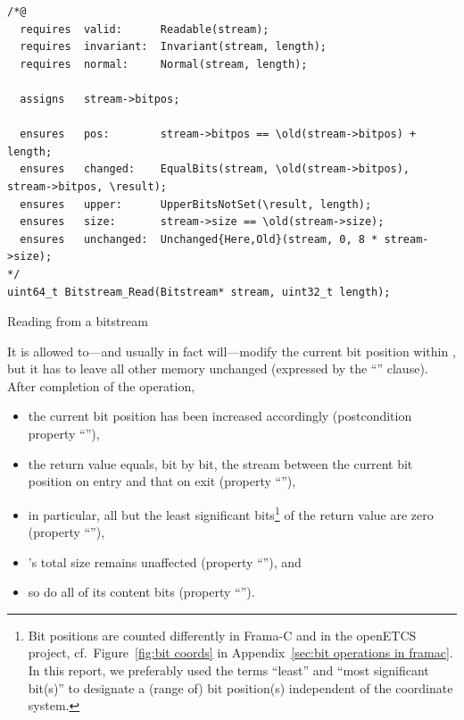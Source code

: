 \begin{listing}[hbt]
\begin{minipage}{0.99\textwidth}
\begin{lstlisting}[style=acsl-block]
/*@
  requires  valid:      Readable(stream);
  requires  invariant:  Invariant(stream, length);
  requires  normal:     Normal(stream, length);

  assigns   stream->bitpos;

  ensures   pos:        stream->bitpos == \old(stream->bitpos) + length;
  ensures   changed:    EqualBits(stream, \old(stream->bitpos), stream->bitpos, \result);
  ensures   upper:      UpperBitsNotSet(\result, length);
  ensures   size:       stream->size == \old(stream->size);
  ensures   unchanged:  Unchanged{Here,Old}(stream, 0, 8 * stream->size);
*/
uint64_t Bitstream_Read(Bitstream* stream, uint32_t length);
\end{lstlisting}
\end{minipage}
\caption{\label{lst:Bitstream_Read spec}Reading from a bitstream}
\end{listing}

\FloatBarrier

It is allowed to---and usually in fact will---modify the current bit
position within , but it has to leave all other memory
unchanged (expressed by the ``'' clause).
%
After completion of the operation, 
%
\begin{itemize}
\item the current bit position has been increased accordingly
	(postcondition property ``''),
\item the return value equals, bit by bit, the stream between the
	current bit position on entry and that on exit
	(property ``''),
\item in particular, all but the  least significant
	bits\footnote{
		Bit positions are counted differently in Frama-C and in
		the openETCS project, cf.\
		Figure~\ref{fig:bit coords} 
		in Appendix~\ref{sec:bit operations in framac}.
		In this report, we preferably used the terms ``least''
		and ``most significant bit(s)'' to
		designate a (range of) bit position(s) independent of
		the coordinate system.
	}
	of the return value are zero
	(property ``''),
\item {}'s total size remains unaffected
	(property ``''), and
\item so do all of its content bits
	(property ``'').
\end{itemize}




